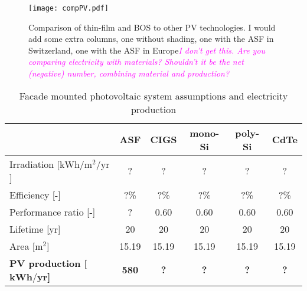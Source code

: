 \begin{figure}[H]
\begin{center}
\texttt{[image: compPV.pdf]}
\caption{Comparison of thin-film and BOS to other PV technologies. I would add some extra columns, one without shading, one with the ASF in Switzerland, one with the ASF in Europe\textcolor{magenta}{\textit{I don't get this. Are you comparing electricity with materials? Shouldn't it be the net (negative) number, combining material and production?}}}
\label{fig:compPV}
\end{center}
\end{figure}

\begin{table}[H]
\begin{tabular}{@{}lccccc@{}}\hline
&\textbf{ASF}&\textbf{CIGS}	& \textbf{mono-Si} 	& \textbf{poly-Si} & \textbf{CdTe}	\\ \hline
Irradiation [${\mathrm{kWh/m^2/yr}}$]& ? & ?	& ? & ? & ? \\
Efficiency [-]						& ?\% & ?\%	& ?\%	& ?\%	& ?\%	\\
Performance ratio [-] 				& ? & 0.60	& 0.60	& 0.60 	& 0.60\\
Lifetime	 [yr]						& 20 & 20 	& 20 	& 20 	& 20\\
Area	 [${\mathrm{m^2}}$]				& 15.19 & 15.19 & 15.19	& 15.19	& 15.19 	\\
\hline
\textbf{PV production [${\mathbf{kWh/yr}}$]	} 		& \textbf{580} &\textbf{?}&\textbf{?}&\textbf{?}&\textbf{?}		\\
\hline
\end{tabular}
\caption{Facade mounted photovoltaic system assumptions and electricity production}
\label{pvoverview}
\end{table}





